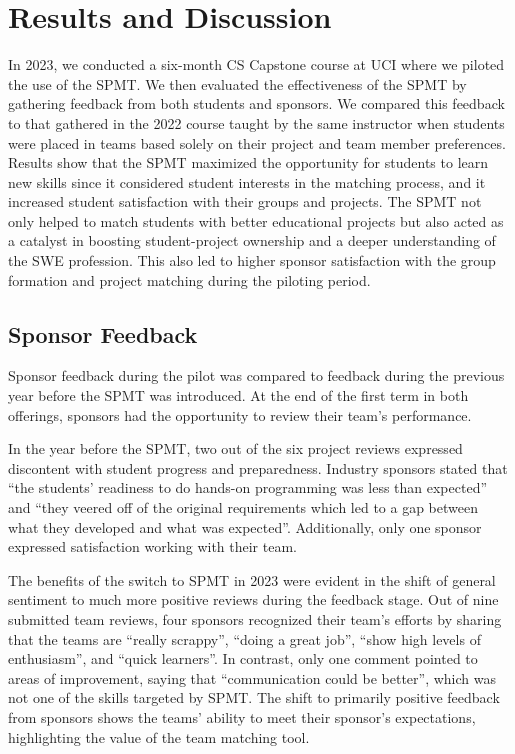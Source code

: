 \section{Results and Discussion}


In 2023, we conducted a six-month CS Capstone course at UCI where we piloted the use of the SPMT. We then evaluated the effectiveness of the SPMT by gathering feedback from both students and sponsors. We compared this feedback to that gathered in the 2022 course taught by the same instructor when students were placed in teams based solely on their project and team member preferences. Results show that the SPMT maximized the opportunity for students to learn new skills since it considered student interests in the matching process, and it increased student satisfaction with their groups and projects. The SPMT not only helped to match students with better educational projects but also acted as a catalyst in boosting student-project ownership and a deeper understanding of the SWE profession. This also led to higher sponsor satisfaction with the group formation and project matching during the piloting period.




\subsection{Sponsor Feedback}
Sponsor feedback during the pilot was compared to feedback during the previous year before the SPMT was introduced. At the end of the first term in both offerings, sponsors had the opportunity to review their team's performance.

In the year before the SPMT, two out of the six project reviews expressed discontent with student progress and preparedness. Industry sponsors stated that ``the students' readiness to do hands-on programming was less than expected'' and ``they veered off of the original requirements which led to a gap between what they developed and what was expected''. Additionally, only one sponsor expressed satisfaction working with their team.


The benefits of the switch to SPMT in 2023 were evident in the shift of general sentiment to much more positive reviews during the feedback stage. Out of nine submitted team reviews, four sponsors recognized their team's efforts by sharing that the teams are ``really scrappy'', ``doing a great job'', ``show high levels of enthusiasm'', and ``quick learners''. In contrast, only one comment pointed to areas of improvement, saying that ``communication could be better'', which was not one of the skills targeted by SPMT.
The shift to primarily positive feedback from sponsors shows the teams' ability to meet their sponsor's expectations, highlighting the value of the team matching tool.


